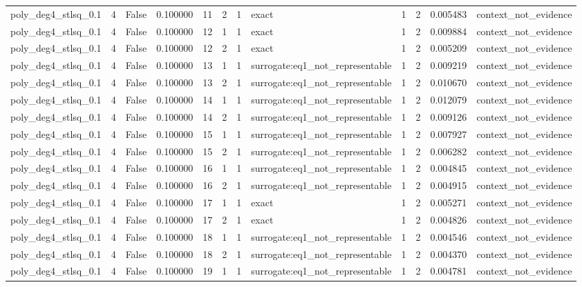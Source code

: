 \begin{tabular}{lrrrrrrlrrrl}
poly\_deg4\_stlsq\_0.1 & 4 & False & 0.100000 & 11 & 2 & 1 & exact & 1 & 2 & 0.005483 & context\_not\_evidence \\
poly\_deg4\_stlsq\_0.1 & 4 & False & 0.100000 & 12 & 1 & 1 & exact & 1 & 2 & 0.009884 & context\_not\_evidence \\
poly\_deg4\_stlsq\_0.1 & 4 & False & 0.100000 & 12 & 2 & 1 & exact & 1 & 2 & 0.005209 & context\_not\_evidence \\
poly\_deg4\_stlsq\_0.1 & 4 & False & 0.100000 & 13 & 1 & 1 & surrogate:eq1\_not\_representable & 1 & 2 & 0.009219 & context\_not\_evidence \\
poly\_deg4\_stlsq\_0.1 & 4 & False & 0.100000 & 13 & 2 & 1 & surrogate:eq1\_not\_representable & 1 & 2 & 0.010670 & context\_not\_evidence \\
poly\_deg4\_stlsq\_0.1 & 4 & False & 0.100000 & 14 & 1 & 1 & surrogate:eq1\_not\_representable & 1 & 2 & 0.012079 & context\_not\_evidence \\
poly\_deg4\_stlsq\_0.1 & 4 & False & 0.100000 & 14 & 2 & 1 & surrogate:eq1\_not\_representable & 1 & 2 & 0.009126 & context\_not\_evidence \\
poly\_deg4\_stlsq\_0.1 & 4 & False & 0.100000 & 15 & 1 & 1 & surrogate:eq1\_not\_representable & 1 & 2 & 0.007927 & context\_not\_evidence \\
poly\_deg4\_stlsq\_0.1 & 4 & False & 0.100000 & 15 & 2 & 1 & surrogate:eq1\_not\_representable & 1 & 2 & 0.006282 & context\_not\_evidence \\
poly\_deg4\_stlsq\_0.1 & 4 & False & 0.100000 & 16 & 1 & 1 & surrogate:eq1\_not\_representable & 1 & 2 & 0.004845 & context\_not\_evidence \\
poly\_deg4\_stlsq\_0.1 & 4 & False & 0.100000 & 16 & 2 & 1 & surrogate:eq1\_not\_representable & 1 & 2 & 0.004915 & context\_not\_evidence \\
poly\_deg4\_stlsq\_0.1 & 4 & False & 0.100000 & 17 & 1 & 1 & exact & 1 & 2 & 0.005271 & context\_not\_evidence \\
poly\_deg4\_stlsq\_0.1 & 4 & False & 0.100000 & 17 & 2 & 1 & exact & 1 & 2 & 0.004826 & context\_not\_evidence \\
poly\_deg4\_stlsq\_0.1 & 4 & False & 0.100000 & 18 & 1 & 1 & surrogate:eq1\_not\_representable & 1 & 2 & 0.004546 & context\_not\_evidence \\
poly\_deg4\_stlsq\_0.1 & 4 & False & 0.100000 & 18 & 2 & 1 & surrogate:eq1\_not\_representable & 1 & 2 & 0.004370 & context\_not\_evidence \\
poly\_deg4\_stlsq\_0.1 & 4 & False & 0.100000 & 19 & 1 & 1 & surrogate:eq1\_not\_representable & 1 & 2 & 0.004781 & context\_not\_evidence \\

\end{tabular}
